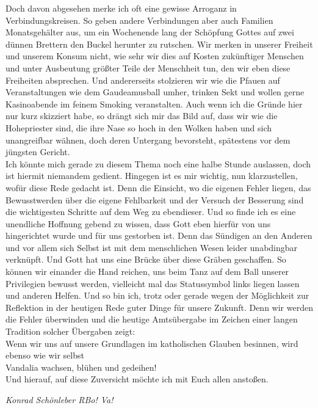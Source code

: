 \begin{multicols}{2}
Doch davon abgesehen merke ich oft eine gewisse Arroganz in Verbindungskreisen. So geben andere Verbindungen aber auch Familien Monatsgehälter aus, um ein Wochenende lang der Schöpfung Gottes auf zwei dünnen Brettern den Buckel herunter zu rutschen. Wir merken in unserer Freiheit und unserem Konsum nicht, wie sehr wir dies auf Kosten zukünftiger Menschen und unter Ausbeutung größter Teile der Menschheit tun, den wir eben diese Freiheiten absprechen. Und andererseits stolzieren wir wie die Pfauen auf Veranstaltungen wie dem Gaudeamusball umher, trinken Sekt und wollen gerne Kasinoabende im feinem Smoking veranstalten.
Auch wenn ich die Gründe hier nur kurz skizziert habe, so drängt sich mir das Bild auf, dass wir wie die Hohepriester sind, die ihre Nase so hoch in den Wolken haben und sich unangreifbar wähnen, doch deren Untergang bevorsteht, spätestens vor dem jüngsten Gericht.
\\
Ich könnte mich gerade zu diesem Thema noch eine halbe Stunde auslassen, doch ist hiermit niemandem gedient.
Hingegen ist es mir wichtig, nun klarzustellen, wofür diese Rede gedacht ist. Denn die Einsicht, wo die eigenen Fehler liegen, das Bewusstwerden über die eigene Fehlbarkeit und der Versuch der Besserung sind die wichtigesten Schritte auf dem Weg zu ebendieser.
Und so finde ich es eine unendliche Hoffnung gebend zu wissen, dass Gott eben hierfür von uns hingerichtet wurde und für uns gestorben ist. Denn das Sündigen an den Anderen und vor allem sich Selbst ist mit dem menschlichen Wesen leider unabdingbar verknüpft. Und Gott hat uns eine Brücke über diese Gräben geschaffen. So können wir einander die Hand reichen, uns beim Tanz auf dem Ball unserer Privilegien bewusst werden, vielleicht mal das Statussymbol links liegen lassen und anderen Helfen. Und so bin ich, trotz oder gerade wegen der Möglichkeit zur Reflektion in der heutigen Rede guter Dinge für unsere Zukunft.
Denn wir werden die Fehler überwinden und die heutige Amtsübergabe im Zeichen einer langen Tradition solcher Übergaben zeigt:
\\
Wenn wir uns auf unsere Grundlagen im katholischen Glauben besinnen, wird ebenso wie wir selbst
\\
Vandalia wachsen, blühen und gedeihen!
\\
Und hierauf, auf diese Zuversicht möchte ich mit Euch allen anstoßen.
\\


	\begin{flushright}
		\hfill\emph{Konrad Schönleber RBo! Va!}
	\end{flushright}
\end{multicols}
%
\begin{figurehere}
	\begin{center}
		
	\end{center}
\end{figurehere}